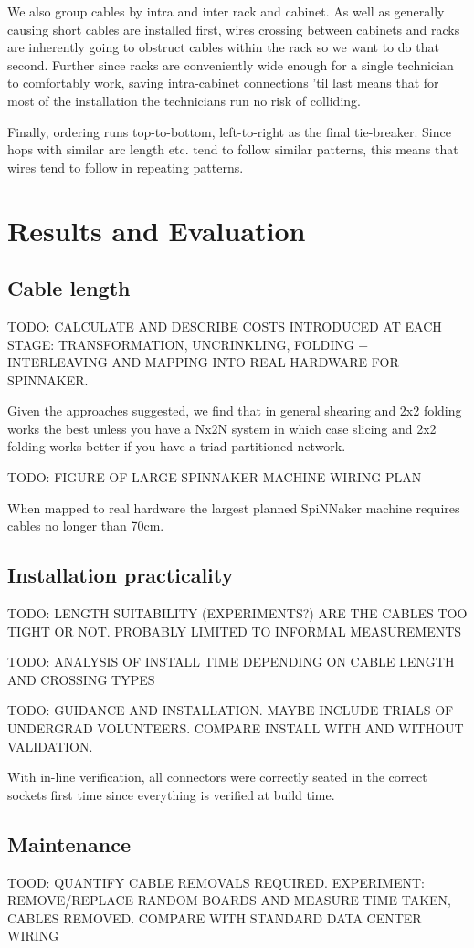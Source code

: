 			We also group cables by intra and inter rack and cabinet. As well as
			generally causing short cables are installed first, wires crossing
			between cabinets and racks are inherently going to obstruct cables within
			the rack so we want to do that second. Further since racks are
			conveniently wide enough for a single technician to comfortably work,
			saving intra-cabinet connections 'til last means that for most of the
			installation the technicians run no risk of colliding.
			
			Finally, ordering runs top-to-bottom, left-to-right as the final
			tie-breaker. Since hops with similar arc length etc. tend to follow
			similar patterns, this means that wires tend to follow in repeating
			patterns.
	
	\section{Results and Evaluation}
		
		\subsection{Cable length}
			
			TODO: CALCULATE AND DESCRIBE COSTS INTRODUCED AT EACH STAGE:
			TRANSFORMATION, UNCRINKLING, FOLDING + INTERLEAVING AND MAPPING INTO REAL
			HARDWARE FOR SPINNAKER.
			
			Given the approaches suggested, we find that in general shearing and 2x2
			folding works the best unless you have a Nx2N system in which case
			slicing and 2x2 folding works better if you have a triad-partitioned
			network.
			
			TODO: FIGURE OF LARGE SPINNAKER MACHINE WIRING PLAN
			
			When mapped to real hardware the largest planned SpiNNaker machine
			requires cables no longer than 70cm.
			
		\subsection{Installation practicality}
			
			TODO: LENGTH SUITABILITY (EXPERIMENTS?) ARE THE CABLES TOO TIGHT OR NOT.
			PROBABLY LIMITED TO INFORMAL MEASUREMENTS
			
			TODO: ANALYSIS OF INSTALL TIME DEPENDING ON CABLE LENGTH AND CROSSING
			TYPES
			
			TODO: GUIDANCE AND INSTALLATION. MAYBE INCLUDE TRIALS OF UNDERGRAD
			VOLUNTEERS. COMPARE INSTALL WITH AND WITHOUT VALIDATION.
			
			With in-line verification, all connectors were correctly seated in the
			correct sockets first time since everything is verified at build time.
			
		\subsection{Maintenance}
			
			TOOD: QUANTIFY CABLE REMOVALS REQUIRED. EXPERIMENT: REMOVE/REPLACE RANDOM
			BOARDS AND MEASURE TIME TAKEN, CABLES REMOVED. COMPARE WITH STANDARD DATA
			CENTER WIRING
